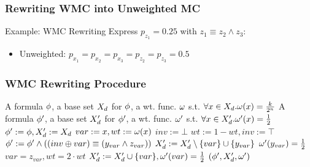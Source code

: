 \begin{frame}
  \frametitle{Rewriting WMC into Unweighted MC}
  \begin{block}{Example: WMC Rewriting}
    Express $p_{z_1}=0.25$ with $z_1\equiv z_2\land z_3$:
    \begin{figure}
      \centering
      
    \end{figure}
    \pause
    \begin{itemize}
      \item Unweighted: $p_{x_1}=p_{x_2}=p_{x_3}=p_{z_2}=p_{z_3}=0.5$
    \end{itemize}
  \end{block}
\end{frame}

\begin{frame}
  \frametitle{WMC Rewriting Procedure}
  {
    \scriptsize
    \begin{algorithmic}[1]
      \REQUIRE A formula $\phi$, a base set $X_d$ for $\phi$,
      a wt. func. $\omega$ s.t. $\forall x\in X_d.\omega(x)=\frac{k}{2^n}$
      \ENSURE A formula $\phi'$, a base set $X_d'$ for $\phi'$,
      a wt. func. $\omega'$ s.t. $\forall x\in X_d'.\omega'(x)=\frac{1}{2}$
      \STATE $\phi':=\phi,X_d':=X_d$
      \STATE $var:=x,wt:=\omega(x)$
      \STATE $inv:=\bot$
      \STATE $wt:=1-wt,inv:=\top$
      \ENDIF
      \STATE $\phi':=\phi'\land((inv \oplus var) \equiv (y_{var} \land z_{var}))$
      \STATE $X_d':=X_d'\setminus\{var\}\cup\{y_{var}\}$
      \STATE $\omega'(y_{var})=\frac{1}{2}$
      \STATE $var=z_{var},wt=2 \cdot wt$
      \ENDWHILE
      \STATE $X_d':=X_d'\cup\{var\},\omega'(var)=\frac{1}{2}$
      \ENDFOR
      \RETURN $(\phi',X_d',\omega')$
    \end{algorithmic}
  }
\end{frame}
